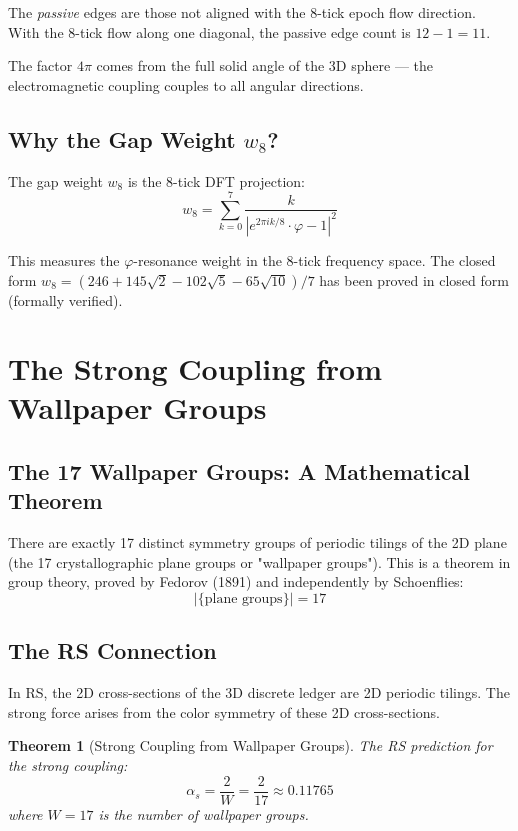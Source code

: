 \documentclass[12pt,a4paper]{article}
\newtheorem{theorem}{Theorem}[section]
\theoremstyle{definition}
\theoremstyle{remark}
\begin{document}
The \emph{passive} edges are those not aligned with the 8-tick epoch flow direction.
With the 8-tick flow along one diagonal, the passive edge count is $12 - 1 = 11$.

The factor $4\pi$ comes from the full solid angle of the 3D sphere — 
the electromagnetic coupling couples to all angular directions.

\subsection{Why the Gap Weight $w_8$?}

The gap weight $w_8$ is the 8-tick DFT projection:
\begin{equation}
w_8 = \sum_{k=0}^{7} \frac{k}{|e^{2\pi i k/8} \cdot \varphi - 1|^2}
\end{equation}

This measures the $\varphi$-resonance weight in the 8-tick frequency space.
The closed form $w_8 = (246 + 145\sqrt{2} - 102\sqrt{5} - 65\sqrt{10})/7$ 
has been proved in closed form (formally verified).

\section{The Strong Coupling from Wallpaper Groups}

\subsection{The 17 Wallpaper Groups: A Mathematical Theorem}

There are exactly 17 distinct symmetry groups of periodic tilings of the 2D plane 
(the 17 crystallographic plane groups or "wallpaper groups"). This is a theorem in 
group theory, proved by Fedorov (1891) and independently by Schoenflies:
\begin{equation}
|\{\text{plane groups}\}| = 17
\end{equation}

\subsection{The RS Connection}

In RS, the 2D cross-sections of the 3D discrete ledger are 2D periodic tilings.
The strong force arises from the color symmetry of these 2D cross-sections.

\begin{theorem}[Strong Coupling from Wallpaper Groups]
The RS prediction for the strong coupling:
\begin{equation}
\boxed{\alpha_s = \frac{2}{W} = \frac{2}{17} \approx 0.11765}
\end{equation}
where $W = 17$ is the number of wallpaper groups.
\end{theorem}
\end{document}
